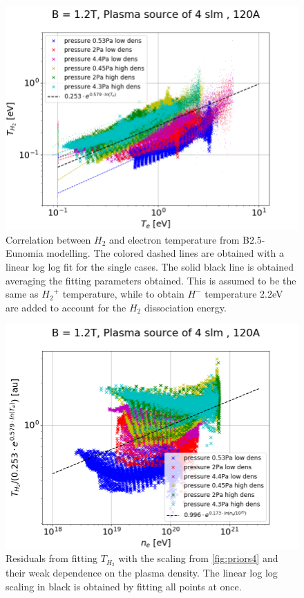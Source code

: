 \begin{figure}[!ht]
	\centering
	\includegraphics[width=0.7\linewidth,trim={0 0 30 45},clip]{Chapters/chapter3/figs/TH2_Te3.png}
	\caption{Correlation between $H_2$ and electron temperature from B2.5-Eunomia modelling. The colored dashed lines are obtained with a linear log log fit for the single cases. The solid black line is obtained averaging the fitting parameters obtained. This is assumed to be the same as ${H_2}^+$ temperature, while to obtain $H^-$ temperature 2.2eV are added to account for the $H_2$ dissociation energy.}
	\label{fig:priors4}
\end{figure}

\begin{figure}[!ht]
	\centering
	\includegraphics[width=0.7\linewidth,trim={0 0 30 45},clip]{Chapters/chapter3/figs/TH2_Te_ne3.png}
	\caption{Residuals from fitting $T_{H_2}$ with the scaling from \autoref{fig:priors4} and their weak dependence on the plasma density. The linear log log scaling in black is obtained by fitting all points at once.}
	\label{fig:priors4b}
\end{figure}

